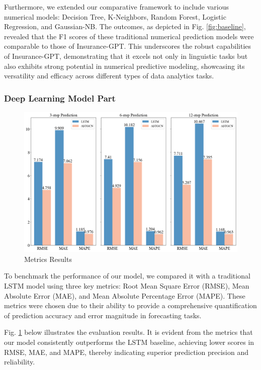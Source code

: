 \documentclass[conference]{IEEEtran}
\begin{document}
Furthermore, we extended our comparative framework to include various numerical models: Decision Tree, K-Neighbors, Random Forest, Logistic Regression, and Gaussian-NB. The outcomes, as depicted in Fig. \ref{fig:baseline}, revealed that the F1 scores of these traditional numerical prediction models were comparable to those of Insurance-GPT. This underscores the robust capabilities of Insurance-GPT, demonstrating that it excels not only in linguistic tasks but also exhibits strong potential in numerical predictive modeling, showcasing its versatility and efficacy across different types of data analytics tasks.


\subsubsection{Deep Learning Model Part}

\begin{figure}[h]
    \centering
    \includegraphics[width=1\linewidth]{eval.png}
    \caption{Metrics Results}
    \label{fig:Metrics}
\end{figure}

To benchmark the performance of our model, we compared it with a traditional LSTM model using three key metrics: Root Mean Square Error (RMSE), Mean Absolute Error (MAE), and Mean Absolute Percentage Error (MAPE). These metrics were chosen due to their ability to provide a comprehensive quantification of prediction accuracy and error magnitude in forecasting tasks.

Fig. \ref{fig:Metrics} below illustrates the evaluation results. It is evident from the metrics that our model consistently outperforms the LSTM baseline, achieving lower scores in RMSE, MAE, and MAPE, thereby indicating superior prediction precision and reliability.
\end{document}
